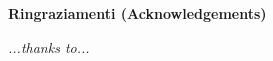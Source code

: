 \thispagestyle{empty}

\begin{center}
  {\bf \Huge Ringraziamenti (Acknowledgements)}
\end{center}

\vspace{4cm}


\emph{
  ...thanks to...
}
